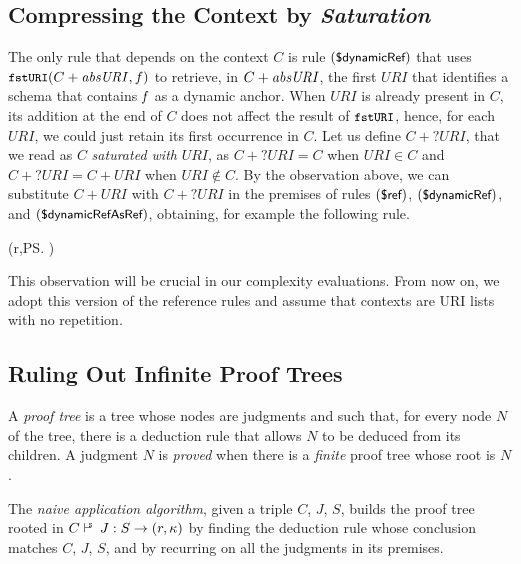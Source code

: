 \subsection{Compressing the Context by \emph{Saturation}}

The only rule that depends on the context $C$ is rule $(\mbox{\sf{\small \$dynamicRef}})$ that uses 
$\mbox{\tt{\small fstURI}}(C+\mathit{absURI},f)$ to retrieve, in $C+\mathit{absURI}$, the first $URI$  that identifies a
schema that contains $\mathit{f}$ as a dynamic anchor. 
When $URI$ is already present in $C$,
its addition at the end of $C$ does not affect the result of $\mbox{\tt{\small fstURI}}$, hence, for each $URI$, we could just retain 
its first occurrence in $C$. Let us define $C+? URI$, that we read as $C$ \emph{saturated with} $URI$, as $C+? URI=C$ when 
$URI\in C$ and $C+?URI=C+URI$ when $URI\not\in C$. By the observation above, we can substitute
$C+URI$ with $C+?URI$ in the premises of rules $(\mbox{\sf{\small \$ref}})$, $(\mbox{\sf{\small \$dynamicRef}})$, and $(\mbox{\sf{\small \$dynamicRef}}\mbox{\sf{\small AsRef}})$,
obtaining, for example the following  rule.

{
 (r,\ps)
}

This observation will be crucial in our complexity evaluations. From now on, we adopt
this version of the reference rules and assume that contexts are URI lists with no repetition.

\subsection{Ruling Out Infinite Proof Trees}\label{sec:termination}

A \emph{proof tree} is a tree whose nodes are judgments and such that, for every node $N$ of the tree, 
there is a deduction rule that allows
$N$ to be deduced from its children. %
A judgment $N$ is \emph{proved} when there is a \emph{finite} proof tree whose root is $N$.

The \emph{naive application algorithm}, given a triple $C$, $J$, $S$, builds the proof tree
rooted in $\SJudg{C}{J}{S}\Ret{r}(r,\ps)$ by
finding the deduction rule whose conclusion matches $C$, $J$, $S$, %
and by recurring on all the judgments in its premises.

